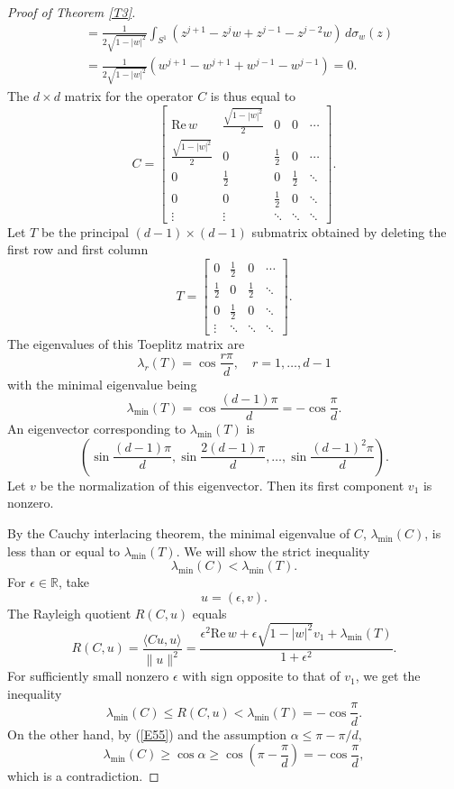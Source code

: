 \documentclass[10pt,a4paper]{amsart}
\newcommand{\R}{\mathbb{R}}
\newcommand\Real{\mathrm{Re}}
\numberwithin{equation}{section}
\begin{document}
\begin{proof}[Proof of Theorem \ref{T3}]
\begin{align*}
 	&=\frac{1}{2\sqrt{1-|w|^2}}\int_{S^1}(z^{j+1}-z^jw+z^{j-1}-z^{j-2}w)\,d\sigma_w(z)\\
 	&=\frac{1}{2\sqrt{1-|w|^2}}(w^{j+1}-w^{j+1}+w^{j-1}-w^{j-1})=0.
 \end{align*}
 The $d\times d$ matrix for the operator $C$ is thus equal to
 \[C=\begin{bmatrix} \Real\,w &\frac{\sqrt{1-|w|^2}}{2}&0&0&\cdots\\
 \frac{\sqrt{1-|w|^2}}{2}&0&\frac12&0&\cdots\\
 0&\frac12&0&\frac12&\ddots\\
 0&0&\frac12&0&\ddots\\
\vdots&\vdots&\ddots&\ddots&\ddots
\end{bmatrix}.	
\]
Let $T$ be the principal $(d-1)\times (d-1)$ submatrix obtained by deleting the first row and first column
\[T=\begin{bmatrix}
 0&\frac12&0&\cdots\\
 \frac12&0&\frac12&\ddots\\
 0&\frac12&0&\ddots\\
\vdots&\ddots&\ddots&\ddots
\end{bmatrix}.	
\]
The eigenvalues of this Toeplitz matrix are 
\[\lambda_r(T)=\cos\frac{r\pi}{d},\quad r=1,\ldots,d-1\]
with the minimal eigenvalue being
\[\lambda_{\min}(T)=\cos\frac{(d-1)\pi}{d}=-\cos{\frac{\pi}{d}}.\]
An eigenvector corresponding to $\lambda_{\min}(T)$ is
\[\left(\sin\frac{(d-1)\pi}{d},\sin\frac{2(d-1)\pi}{d},\ldots,\sin\frac{(d-1)^2\pi}{d}\right).\]
Let $v$ be the normalization of this eigenvector. Then its first component $v_1$ is nonzero. 

By the Cauchy interlacing theorem, the minimal eigenvalue of $C$, $\lambda_{\min}(C)$, is less than or equal to $\lambda_{\min}(T)$. We will show the strict inequality
\[\lambda_{\min}(C)<\lambda_{\min}(T).\]
For $\epsilon\in\R$, take
\[u=(\epsilon,v).\]
The Rayleigh quotient $R(C,u)$ equals
\[R(C,u)=\frac{\langle Cu,u\rangle}{\|u\|^2}=\frac{\epsilon^2 \Real\,w+ \epsilon\sqrt{1-|w|^2}v_1+\lambda_{\min}(T)}{1+\epsilon^2}.\]
For sufficiently small nonzero $\epsilon$ with sign opposite to that of  $v_1$, we get the inequality
\[\lambda_{\min}(C)\le R(C,u)<\lambda_{\min}(T)=-\cos\frac{\pi}{d}.\]
On the other hand, by (\ref{E55}) and the assumption $\alpha\le \pi-\pi/d,$
\[\lambda_{\min}(C)\ge\cos \alpha\ge \cos\left(\pi-\frac{\pi}{d}\right)=-\cos\frac{\pi}{d},\]
 which is a contradiction.
\end{proof}
\end{document}
